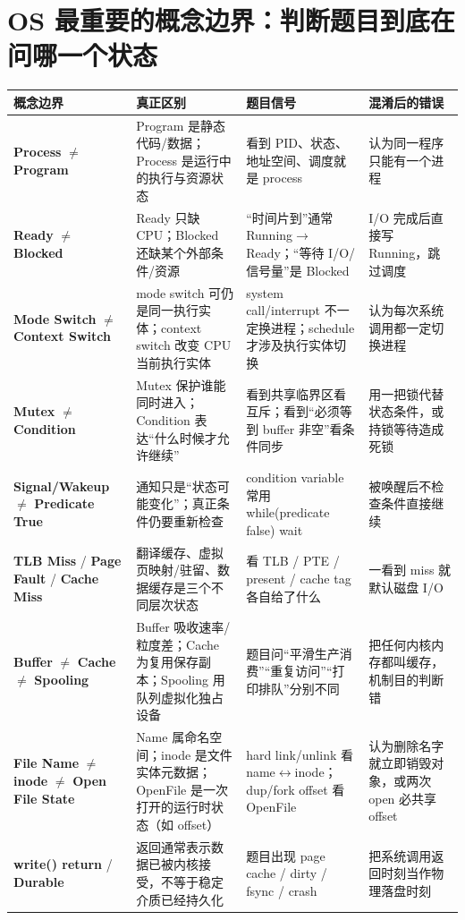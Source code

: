 \documentclass[11pt,a4paper,openany]{ctexbook}
\newcommand{\key}[1]{\textbf{\color{deep}#1}}
\begin{document}
\section{OS 最重要的概念边界：判断题目到底在问哪一个状态}
\begin{longtable}{L{3.6cm}L{4.35cm}L{3.95cm}L{\dimexpr\linewidth-13.17cm\relax}}
\toprule
\textbf{概念边界} & \textbf{真正区别} & \textbf{题目信号} & \textbf{混淆后的错误}\\
\midrule
\key{Process} $\neq$ \key{Program} & Program 是静态代码/数据；Process 是运行中的执行与资源状态 & 看到 PID、状态、地址空间、调度就是 process & 认为同一程序只能有一个进程 \\
\midrule
\key{Ready} $\neq$ \key{Blocked} & Ready 只缺 CPU；Blocked 还缺某个外部条件/资源 & “时间片到”通常 Running$\to$Ready；“等待 I/O/信号量”是 Blocked & I/O 完成后直接写 Running，跳过调度 \\
\midrule
\key{Mode Switch} $\neq$ \key{Context Switch} & mode switch 可仍是同一执行实体；context switch 改变 CPU 当前执行实体 & system call/interrupt 不一定换进程；schedule 才涉及执行实体切换 & 认为每次系统调用都一定切换进程 \\
\midrule
\key{Mutex} $\neq$ \key{Condition} & Mutex 保护谁能同时进入；Condition 表达“什么时候才允许继续” & 看到共享临界区看互斥；看到“必须等到 buffer 非空”看条件同步 & 用一把锁代替状态条件，或持锁等待造成死锁 \\
\midrule
\key{Signal/Wakeup} $\neq$ \key{Predicate True} & 通知只是“状态可能变化”；真正条件仍要重新检查 & condition variable 常用 while(predicate false) wait & 被唤醒后不检查条件直接继续 \\
\midrule
\key{TLB Miss} / \key{Page Fault} / \key{Cache Miss} & 翻译缓存、虚拟页映射/驻留、数据缓存是三个不同层次状态 & 看 TLB / PTE / present / cache tag 各自给了什么 & 一看到 miss 就默认磁盘 I/O \\
\midrule
\key{Buffer} $\neq$ \key{Cache} $\neq$ \key{Spooling} & Buffer 吸收速率/粒度差；Cache 为复用保存副本；Spooling 用队列虚拟化独占设备 & 题目问“平滑生产消费”“重复访问”“打印排队”分别不同 & 把任何内核内存都叫缓存，机制目的判断错 \\
\midrule
\key{File Name} $\neq$ \key{inode} $\neq$ \key{Open File State} & Name 属命名空间；inode 是文件实体元数据；OpenFile 是一次打开的运行时状态（如 offset） & hard link/unlink 看 name$\leftrightarrow$inode；dup/fork offset 看 OpenFile & 认为删除名字就立即销毁对象，或两次 open 必共享 offset \\
\midrule
\key{write() return} / \key{Durable} & 返回通常表示数据已被内核接受，不等于稳定介质已经持久化 & 题目出现 page cache / dirty / fsync / crash & 把系统调用返回时刻当作物理落盘时刻 \\
\bottomrule
\end{longtable}
\end{document}
